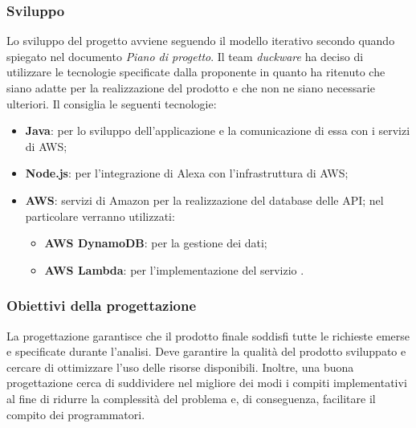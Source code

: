 \subsubsection{Sviluppo}
Lo sviluppo del progetto avviene seguendo il modello iterativo secondo quando spiegato nel documento \textit{Piano di progetto}. Il team \textit{duckware} ha deciso di utilizzare le tecnologie specificate dalla proponente in quanto ha ritenuto che siano adatte per la realizzazione del prodotto e che non ne siano necessarie ulteriori. Il  consiglia le seguenti tecnologie:
\begin{itemize}
    \item \textbf{Java}: per lo sviluppo dell'applicazione e la comunicazione di essa con i servizi di AWS;
    \item \textbf{Node.js}: per l'integrazione di Alexa con l'infrastruttura di AWS;
    \item \textbf{AWS}: servizi di Amazon per la realizzazione del database delle API; nel particolare verranno utilizzati: 
    \begin{itemize}
        \item \textbf{AWS DynamoDB}: per la gestione dei dati;
        \item \textbf{AWS Lambda}: per l'implementazione del servizio .
    \end{itemize}
\end{itemize}
\subsubsection{Obiettivi della progettazione}
La progettazione garantisce che il prodotto finale soddisfi tutte le richieste emerse e specificate durante l’analisi. Deve garantire la qualità del prodotto sviluppato e cercare di ottimizzare l’uso delle risorse disponibili. Inoltre, una buona progettazione cerca di suddividere nel migliore dei modi i compiti implementativi al fine di ridurre la complessità del problema e, di conseguenza, facilitare il compito dei programmatori.
